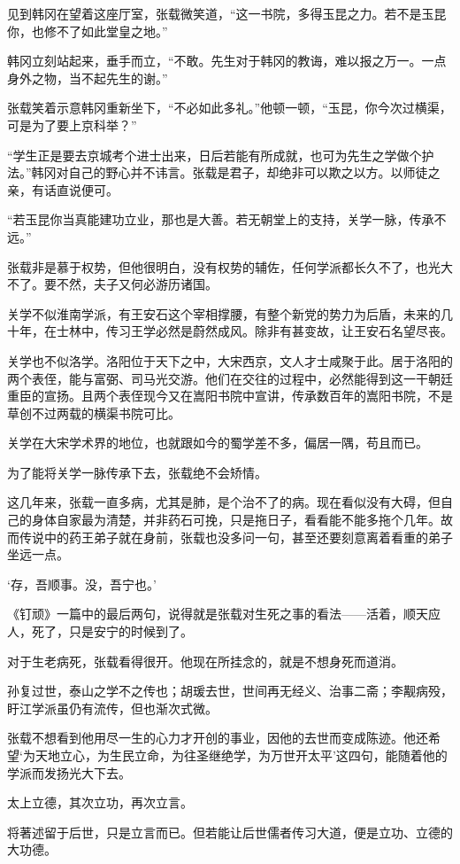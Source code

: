 见到韩冈在望着这座厅室，张载微笑道，“这一书院，多得玉昆之力。若不是玉昆你，也修不了如此堂皇之地。”

韩冈立刻站起来，垂手而立，“不敢。先生对于韩冈的教诲，难以报之万一。一点身外之物，当不起先生的谢。”

张载笑着示意韩冈重新坐下，“不必如此多礼。”他顿一顿，“玉昆，你今次过横渠，可是为了要上京科举？”

“学生正是要去京城考个进士出来，日后若能有所成就，也可为先生之学做个护法。”韩冈对自己的野心并不讳言。张载是君子，却绝非可以欺之以方。以师徒之亲，有话直说便可。

“若玉昆你当真能建功立业，那也是大善。若无朝堂上的支持，关学一脉，传承不远。”

张载非是慕于权势，但他很明白，没有权势的辅佐，任何学派都长久不了，也光大不了。要不然，夫子又何必游历诸国。

关学不似淮南学派，有王安石这个宰相撑腰，有整个新党的势力为后盾，未来的几十年，在士林中，传习王学必然是蔚然成风。除非有甚变故，让王安石名望尽丧。

关学也不似洛学。洛阳位于天下之中，大宋西京，文人才士咸聚于此。居于洛阳的两个表侄，能与富弼、司马光交游。他们在交往的过程中，必然能得到这一干朝廷重臣的宣扬。且两个表侄现今又在嵩阳书院中宣讲，传承数百年的嵩阳书院，不是草创不过两载的横渠书院可比。

关学在大宋学术界的地位，也就跟如今的蜀学差不多，偏居一隅，苟且而已。

为了能将关学一脉传承下去，张载绝不会矫情。

这几年来，张载一直多病，尤其是肺，是个治不了的病。现在看似没有大碍，但自己的身体自家最为清楚，并非药石可挽，只是拖日子，看看能不能多拖个几年。故而传说中的药王弟子就在身前，张载也没多问一句，甚至还要刻意离着看重的弟子坐远一点。

‘存，吾顺事。没，吾宁也。’

《钉顽》一篇中的最后两句，说得就是张载对生死之事的看法——活着，顺天应人，死了，只是安宁的时候到了。

对于生老病死，张载看得很开。他现在所挂念的，就是不想身死而道消。

孙复过世，泰山之学不之传也；胡瑗去世，世间再无经义、治事二斋；李觏病殁，盱江学派虽仍有流传，但也渐次式微。

张载不想看到他用尽一生的心力才开创的事业，因他的去世而变成陈迹。他还希望‘为天地立心，为生民立命，为往圣继绝学，为万世开太平’这四句，能随着他的学派而发扬光大下去。

太上立德，其次立功，再次立言。

将著述留于后世，只是立言而已。但若能让后世儒者传习大道，便是立功、立德的大功德。

